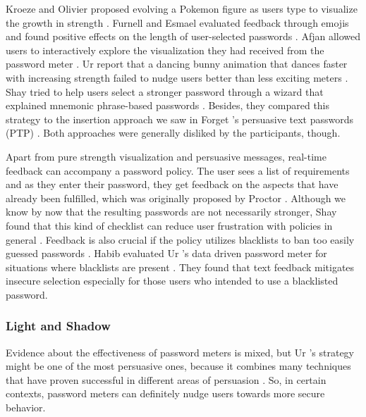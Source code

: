 	Kroeze and Olivier proposed evolving a Pokemon figure as users type to visualize the growth in strength  \cite{Kroeze2012GamifyingAuthentication}. Furnell and Esmael evaluated feedback through emojis and found positive effects on the length of user-selected passwords \cite{Furnell2017GuidanceCompliance}. Afjan \etal allowed users to interactively explore the visualization they had received from the password meter \cite{Aljaffan2017PasswordSecurityVisualizer}. Ur \etal report that a dancing bunny animation that dances faster with increasing strength failed to nudge users better than less exciting meters \cite{Ur2012HowDoesYourPasswordMeasureUp}. Shay \etal tried to help users select a stronger password through a wizard that explained mnemonic phrase-based passwords \cite{Shay2015SpoonfulOfSugar}. Besides, they compared this strategy to the insertion approach we saw in Forget \etal's persuasive text passwords (PTP) \cite{Forget2008ImprovingPasswordsThroughPersuasion}. Both approaches were generally disliked by the participants, though. 
	
	Apart from pure strength visualization and persuasive messages, real-time feedback can accompany a password policy. The user sees a list of requirements and as they enter their password, they get feedback on the aspects that have already been fulfilled, which was originally proposed by Proctor \etal \cite{Proctor2002ImprovingAuthenticationProactivePasswordRestrictions}. Although we know by now that the resulting passwords are not necessarily stronger, Shay \etal found that this kind of checklist can reduce user frustration with policies in general \cite{Shay2015SpoonfulOfSugar}. Feedback is also crucial if the policy utilizes blacklists to ban too easily guessed passwords \cite{Shay2014CanLongPasswordsBeSecureAndUsable}. Habib \etal evaluated Ur \etal's data driven password meter for situations where blacklists are present \cite{Habib2017Blacklists}. They found that text feedback mitigates insecure selection especially for those users who intended to use a blacklisted password. 

	\subsubsection{Light and Shadow}
	Evidence about the effectiveness of password meters is mixed, but Ur \etal's strategy might be one of the most persuasive ones, because it combines many techniques that have proven successful in different areas of persuasion \cite{Ur2017DataDrivenPWMeter}. So, in certain contexts, password meters can definitely nudge users towards more secure behavior. 
	
